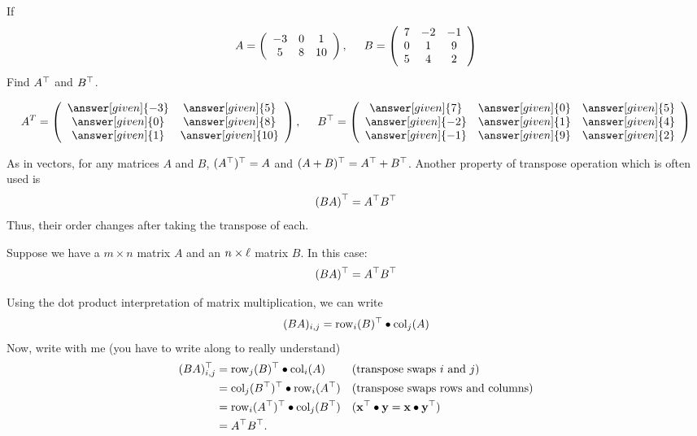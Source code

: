 \documentclass{ximera}
\begin{document}
\begin{question}
If
\[A= \left(\begin{array}{ccc}
-3 & 0 & 1\\
5 & 8 & 10
\end{array}\right), \hspace{.5cm} B = \left(\begin{array}{ccc}
7 & -2 & -1 \\
0 & 1 & 9 \\
5 & 4 & 2
\end{array}\right)\]
Find $A^{\top}$ and $B^{\top}$.

\begin{prompt}
\[A^{T} = \left(\begin{array}{cc}
\answer[given]{-3} & \answer[given]{5}\\
\answer[given]{0} & \answer[given]{8}\\
\answer[given]{1} & \answer[given]{10}
\end{array}\right), \hspace{.5cm} B^{\transpose}= \left(\begin{array}{ccc}
\answer[given]{7} & \answer[given]{0} & \answer[given]{5}\\
\answer[given]{-2} & \answer[given]{1} & \answer[given]{4}\\
\answer[given]{-1} & \answer[given]{9} & \answer[given]{2}
\end{array}\right)\]
\end{prompt}
\end{question}


As in vectors, for any matrices $A$ and $B$,
$(A^{\top})^{\top} = A$ and $(A+ B)^{\top} =
A^{\top} + B^{\top}$. Another property of transpose
operation which is often used is
\[
\left(BA\right)^{\top} = A^{\top} B^{\top}
\]
Thus, their order changes after taking the transpose of each.



\begin{proposition}
  Suppose we have a $m\times n$ matrix $A$ and an $n\times \ell$ matrix $B$. In this case:
  \[
  (BA)^\top = A^\top B^\top
  \]
  \begin{explanation}
    Using the dot product interpretation of matrix multiplication, we can write
    \[
      (BA)_{i,j} = \operatorname{row}_i(B)^\top \bullet \operatorname{col}_j(A)
    \]
    Now, write with me (you have to write along to really understand)
    \begin{align*}
      (BA)_{i,j}^\top &= \operatorname{row}_j(B)^\top \bullet \operatorname{col}_i(A) & & (\text{transpose swaps $i$ and $j$})\\
      &= \operatorname{col}_j(B^\top)^\top \bullet \operatorname{row}_i(A^\top) & & (\text{transpose swaps rows and columns})\\
      &= \operatorname{row}_i(A^\top)^\top \bullet \operatorname{col}_j(B^\top) & & (\mathbf{x}^\top \bullet \mathbf{y} = \mathbf{x}\bullet \mathbf{y}^\top)\\
      &= A^\top B^\top.
    \end{align*}
  \end{explanation}
\end{proposition}
\end{document}
